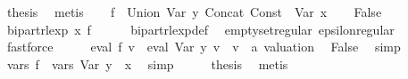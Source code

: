 \begin{isabellebody}
\ {\isacharquery}{\kern0pt}thesis\ \isamarkupfalse%
\ metis\isanewline
{}\isamarkupfalse%
\isanewline
\ \ \isamarkupfalse%
\ {\isacharquery}{\kern0pt}f{\isacharprime}{\kern0pt}\ {\isacharequal}{\kern0pt}\ {\isachardoublequoteopen}Union\ {\isacharparenleft}{\kern0pt}Var\ y{\isacharparenright}{\kern0pt}\ {\isacharparenleft}{\kern0pt}Concat\ {\isacharparenleft}{\kern0pt}Const\ {\isacharbraceleft}{\kern0pt}{\isacharbraceright}{\kern0pt}{\isacharparenright}{\kern0pt}\ {\isacharparenleft}{\kern0pt}Var\ x{\isacharparenright}{\kern0pt}{\isacharparenright}{\kern0pt}{\isachardoublequoteclose}\isanewline
\ \ \isamarkupfalse%
\ False\isanewline
\ \ \isamarkupfalse%
\ \isamarkupfalse%
\ {\isachardoublequoteopen}bipart{\isacharunderscore}{\kern0pt}rlexp\ x\ {\isacharquery}{\kern0pt}f{\isacharprime}{\kern0pt}{\isachardoublequoteclose}\isanewline
\ \ \ \ \isamarkupfalse%
\ bipart{\isacharunderscore}{\kern0pt}rlexp{\isacharunderscore}{\kern0pt}def\ \isamarkupfalse%
\ emptyset{\isacharunderscore}{\kern0pt}regular\ epsilon{\isacharunderscore}{\kern0pt}regular\ \isamarkupfalse%
\ fastforce\isanewline
\ \ \isamarkupfalse%
\ \isamarkupfalse%
\ {\isachardoublequoteopen}eval\ {\isacharquery}{\kern0pt}f{\isacharprime}{\kern0pt}\ v\ {\isacharequal}{\kern0pt}\ eval\ {\isacharparenleft}{\kern0pt}Var\ y{\isacharparenright}{\kern0pt}\ v{\isachardoublequoteclose}\ \ v\ {\isacharcolon}{\kern0pt}{\isacharcolon}{\kern0pt}\ {\isachardoublequoteopen}{\isacharprime}{\kern0pt}a\ valuation{\isachardoublequoteclose}\ \isamarkupfalse%
\ False\ \isamarkupfalse%
\ simp\isanewline
\ \ \isamarkupfalse%
\ \isamarkupfalse%
\ {\isachardoublequoteopen}vars\ {\isacharquery}{\kern0pt}f{\isacharprime}{\kern0pt}\ {\isacharequal}{\kern0pt}\ vars\ {\isacharparenleft}{\kern0pt}Var\ y{\isacharparenright}{\kern0pt}\ {\isasymunion}\ {\isacharbraceleft}{\kern0pt}x{\isacharbraceright}{\kern0pt}{\isachardoublequoteclose}\ \isamarkupfalse%
\ simp\isanewline
\ \ \isamarkupfalse%
\ \isamarkupfalse%
\ {\isacharquery}{\kern0pt}thesis\ \isamarkupfalse%
\ metis\isanewline
{}\isamarkupfalse%
%
\endisatagproof
{\isafoldproof}%
%
\isadelimproof
\isanewline
%
\endisadelimproof
\isanewline
{}\isamarkupfalse%

\end{isabellebody}
